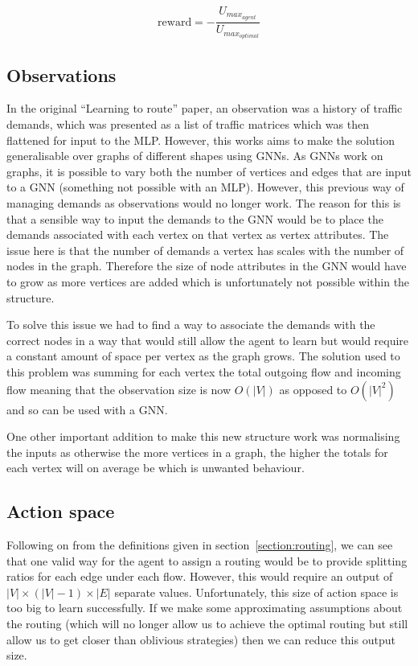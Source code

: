 \begin{equation}
  \label{equation:reward}
  \mathrm{reward} = -\frac{U_{max_{agent}}}{U_{max_{optimal}}}
\end{equation}

\subsection{Observations}
In the original ``Learning to route'' paper, an observation was a history of traffic demands, which was presented as a list of traffic matrices which was then flattened for input to the MLP. However, this works aims to make the solution generalisable over graphs of different shapes using GNNs. As GNNs work on graphs, it is possible to vary both the number of vertices and edges that are input to a GNN (something not possible with an MLP). However, this previous way of managing demands as observations would no longer work. The reason for this is that a sensible way to input the demands to the GNN would be to place the demands associated with each vertex on that vertex as vertex attributes. The issue here is that the number of demands a vertex has scales with the number of nodes in the graph. Therefore the size of node attributes in the GNN would have to grow as more vertices are added which is unfortunately not possible within the structure.

To solve this issue we had to find a way to associate the demands with the correct nodes in a way that would still allow the agent to learn but would require a constant amount of space per vertex as the graph grows. The solution used to this problem was summing for each vertex the total outgoing flow and incoming flow meaning that the observation size is now $O(|V|)$ as opposed to $O(|V|^2)$ and so can be used with a GNN.

One other important addition to make this new structure work was normalising the inputs as otherwise the more vertices in a graph, the higher the totals for each vertex will on average be which is unwanted behaviour.

\subsection{Action space}
Following on from the definitions given in section~\ref{section:routing}, we can see that one valid way for the agent to assign a routing would be to provide splitting ratios for each edge under each flow. However, this would require an output of $|V|\times(|V|-1)\times|E|$ separate values. Unfortunately, this size of action space is too big to learn successfully. If we make some approximating assumptions about the routing (which will no longer allow us to achieve the optimal routing but still allow us to get closer than oblivious strategies) then we can reduce this output size.


